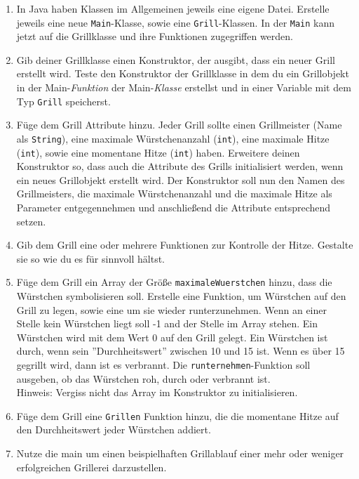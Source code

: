 \documentclass{../../sheet}
\begin{document}
\begin{enumerate}
    \item In Java haben Klassen im Allgemeinen jeweils eine eigene Datei. Erstelle jeweils eine neue \texttt{Main}-Klasse, sowie eine \texttt{Grill}-Klassen. In der \texttt{Main} kann jetzt auf die Grillklasse und ihre Funktionen zugegriffen werden.
    \item Gib deiner Grillklasse einen Konstruktor, der ausgibt, dass ein neuer Grill erstellt wird. Teste den Konstruktor der Grillklasse in dem du ein Grillobjekt in der Main-\textit{Funktion} der Main-\textit{Klasse} erstellst und in einer Variable mit dem Typ \texttt{Grill} speicherst.
    \item Füge dem Grill Attribute hinzu. Jeder Grill sollte einen Grillmeister (Name als \texttt{String}), eine maximale Würstchenanzahl (\texttt{int}), eine maximale Hitze (\texttt{int}), sowie eine momentane Hitze (\texttt{int}) haben. Erweitere deinen Konstruktor so, dass auch die Attribute des Grills initialisiert werden, wenn ein neues Grillobjekt erstellt wird. Der Konstruktor soll nun den Namen des Grillmeisters, die maximale Würstchenanzahl und die maximale Hitze als Parameter entgegennehmen und anschließend die Attribute entsprechend setzen.
    \item Gib dem Grill eine oder mehrere Funktionen zur Kontrolle der Hitze. Gestalte sie so wie du es für sinnvoll hältst.
    \item Füge dem Grill ein Array der Größe \texttt{maximaleWuerstchen} hinzu, dass die Würstchen symbolisieren soll. Erstelle eine Funktion, um Würstchen auf den Grill zu legen, sowie eine um sie wieder runterzunehmen. Wenn an einer Stelle kein Würstchen liegt soll -1 and der Stelle im Array stehen. Ein Würstchen wird mit dem Wert 0 auf den Grill gelegt. Ein Würstchen ist durch, wenn sein ''Durchheitswert'' zwischen 10 und 15 ist. Wenn es über 15 gegrillt wird, dann ist es verbrannt. Die \texttt{runternehmen}-Funktion soll ausgeben, ob das Würstchen roh, durch oder verbrannt ist.\\
          Hinweis: Vergiss nicht das Array im Konstruktor zu initialisieren.
    \item Füge dem Grill eine \texttt{Grillen} Funktion hinzu, die die momentane Hitze auf den Durchheitswert jeder Würstchen addiert.
    \item Nutze die main um einen beispielhaften Grillablauf einer mehr oder weniger erfolgreichen Grillerei darzustellen.
\end{enumerate}
\end{document}
